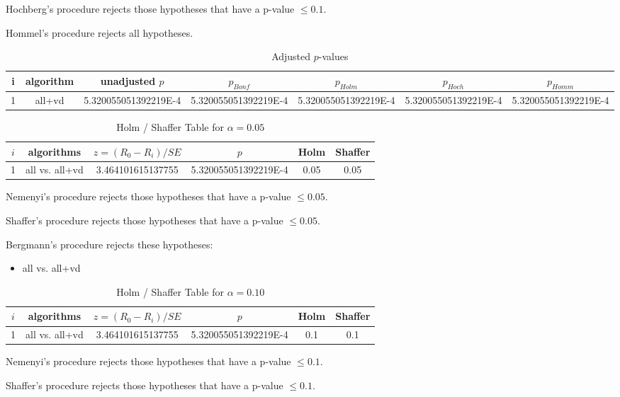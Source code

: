 \documentclass[a4paper,10pt]{article}
\begin{document}
\begin{landscape}
Hochberg's procedure rejects those hypotheses that have a p-value $\le0.1$.


Hommel's procedure rejects all hypotheses.


\begin{table}[!htp]
\centering\tiny
\caption{Adjusted $p$-values}
\begin{tabular}{ccccccc}
i&algorithm&unadjusted $p$&$p_{Bonf}$&$p_{Holm}$&$p_{Hoch}$&$p_{Homm}$\\
\hline
1&all+vd&5.320055051392219E-4&5.320055051392219E-4&5.320055051392219E-4&5.320055051392219E-4&5.320055051392219E-4\\
\hline
\end{tabular}
\end{table}

\begin{table}[!htp]
\centering\tiny
\caption{Holm / Shaffer Table for $\alpha=0.05$}
\begin{tabular}{cccccc}
$i$&algorithms&$z=(R_0 - R_i)/SE$&$p$&Holm&Shaffer\\
\hline
1&all vs. all+vd&3.464101615137755&5.320055051392219E-4&0.05&0.05\\\hline
\end{tabular}
\end{table}
Nemenyi's procedure rejects those hypotheses that have a p-value $\le0.05$.


Shaffer's procedure rejects those hypotheses that have a p-value $\le0.05$.


Bergmann's procedure rejects these hypotheses:


\begin{itemize}


\item all vs. all+vd\end{itemize}


\begin{table}[!htp]
\centering\tiny
\caption{Holm / Shaffer Table for $\alpha=0.10$}
\begin{tabular}{cccccc}
$i$&algorithms&$z=(R_0 - R_i)/SE$&$p$&Holm&Shaffer\\
\hline
1&all vs. all+vd&3.464101615137755&5.320055051392219E-4&0.1&0.1\\\hline
\end{tabular}
\end{table}
Nemenyi's procedure rejects those hypotheses that have a p-value $\le0.1$.


Shaffer's procedure rejects those hypotheses that have a p-value $\le0.1$.



\end{landscape}
\end{document}
